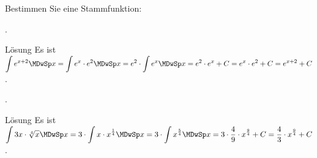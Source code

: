 \begin{MExercises}
\begin{MExercise}
Bestimmen Sie eine Stammfunktion:
\begin{MExerciseItems}
\item{.}
\begin{MHint}{Lösung}
Es ist
$\displaystyle \int \MEU^{x+2} \MDwSp x = %
\int \MEU^x \cdot \MEU^2 \MDwSp x = %
\MEU^2 \cdot \int \MEU^x \MDwSp x = %
\MEU^2 \cdot \MEU^x + C = %
\MEU^x \cdot \MEU^2 + C = %
\MEU^{x + 2} + C$.
\end{MHint}
%
\item{.}
\begin{MHint}{Lösung}
Es ist
$\displaystyle \int 3 x \cdot \sqrt[4]{x} \MDwSp x = %
3 \cdot \int x \cdot x^{\frac{1}{4}} \MDwSp x = %
3 \cdot \int x^{\frac{5}{4}} \MDwSp x = %
3 \cdot \frac{4}{9} \cdot x^{\frac{9}{4}} + C = %
\frac{4}{3} \cdot x^{\frac{9}{4}} + C$.
\end{MHint}
\end{MExerciseItems}
\jHTMLHinweisEingabeFunktionenExp
\end{MExercise}

%


\end{MExercises}
